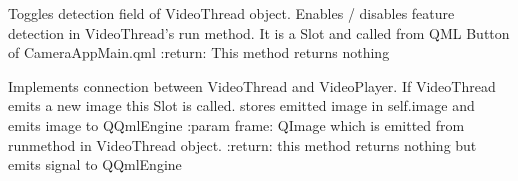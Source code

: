 \documentclass[letterpaper,10pt,english]{sphinxmanual}
\begin{document}
\begin{fulllineitems}
\begin{fulllineitems}
\end{fulllineitems}


\begin{fulllineitems}
\label{\detokenize{modules:src.cameraApplication.cameraProcessing.VideoPlayer.toggleDetection}}
\pysigstartsignatures
{}
\pysigstopsignatures
\sphinxAtStartPar
Toggles detection field of VideoThread object. Enables / disables feature detection in VideoThread’s run method.
It is a Slot and called from QML Button of CameraAppMain.qml
:return: This method returns nothing

\end{fulllineitems}


\begin{fulllineitems}
\label{\detokenize{modules:src.cameraApplication.cameraProcessing.VideoPlayer.updateImage}}
\pysigstartsignatures
{}
\pysigstopsignatures
\sphinxAtStartPar
Implements connection between VideoThread and VideoPlayer. If VideoThread emits a new image this Slot is called.
stores emitted image in self.image and emits image to QQmlEngine
:param frame: QImage which is emitted from run\sphinxhyphen{}method in VideoThread object.
:return: this method returns nothing but emits signal to QQmlEngine

\end{fulllineitems}


\end{fulllineitems}

\end{document}
